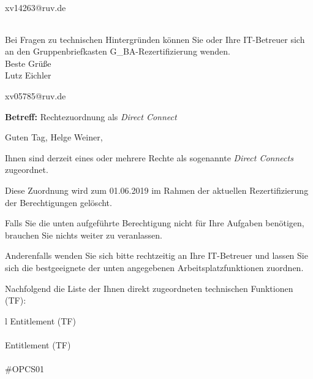 \documentclass[a4paper,landscape,12pt]{letter}
\begin{document}
\begin{letter}{xv14263@ruv.de\hfill \break}
\begin{tiny}
\begin{longtable}{|p{35mm}|p{15mm}|p{25mm}|p{10mm}|p{40mm}|p{50mm}|p{50mm}|}
\hline
		\end{longtable}
		\end{tiny}
	
\begin{minipage}{\textwidth}
			Bei Fragen zu technischen Hintergründen können Sie 
			oder Ihre IT-Betreuer sich an den Gruppenbriefkasten 
			G\_BA-Rezertifizierung
			wenden.\\
			\linebreak
			Beste Grüße\\
			Lutz Eichler
	\end{minipage}
	\end{letter}
	
\begin{letter}{xv05785@ruv.de\hfill \break}
\begin{normalsize}
	\opening{\textbf{Betreff:} Rechtezuordnung als \emph{Direct Connect}}
	\begin{normalsize} \hfill
	\end{normalsize}

	\begin{normalsize}
		Guten Tag, 
	Helge Weiner, \hfill \break
	\end{normalsize}
	\end{normalsize}
	
\begin{normalsize}
	Ihnen sind derzeit eines oder mehrere Rechte als sogenannte \emph{Direct Connects} zugeordnet.
	
	Diese Zuordnung wird zum 01.06.2019 im Rahmen der aktuellen Rezertifizierung der Berechtigungen gelöscht.
	
	Falls Sie die unten aufgeführte Berechtigung nicht für Ihre Aufgaben benötigen, 
	brauchen Sie nichts weiter zu veranlassen.
	
	Anderenfalls wenden Sie sich bitte rechtzeitig an Ihre IT-Betreuer 
	und lassen Sie sich die bestgeeignete der unten angegebenen Arbeitsplatzfunktionen zuordnen.
	\end{normalsize}
	
\begin{normalsize}
	Nachfolgend die Liste der Ihnen direkt zugeordneten technischen Funktionen (TF):

	\begin{longtable}{l}
		Entitlement (TF) \\ \hline
		\endfirsthead
		\\\hline
		Entitlement (TF) \\ \hline
		\endhead %
		\multicolumn{1}{r@{}}{Fortsetzung \ldots}\\
		\endfoot
		\hline
		\endlastfoot
	\#OPCS01\\
	\end{longtable}
	\end{normalsize}
	

\end{letter}
\end{document}
